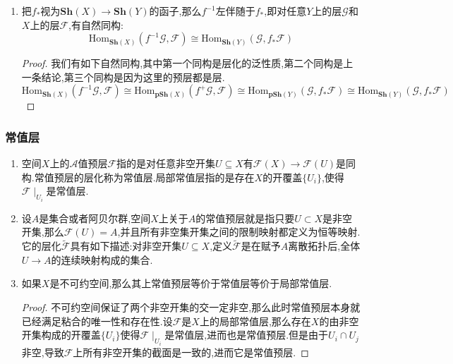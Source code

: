 \begin{enumerate}
\begin{enumerate}[(1)]
\begin{proof}
			反过来设$\psi:\mathscr{G}\to f_*\mathscr{F}$是预层之间的态射,需要构造它诱导的预层之间的态射$\psi':f^{-1}\mathscr{G}\to\mathscr{F}$:取$X$的开子集$U$,取$s\in f^+\mathscr{G}(U)$,如果开集$V\subset Y$满足$f(U)\subset V$,并且存在$s_V\in\mathscr{G}(V)$在正向极限$f^+\mathscr{G}$中的像是$s$,那么$\psi(V)(s_V)\in f_*\mathscr{F}(V)=\mathscr{F}(f^{-1}(V))$,就设$\psi'(U)(s)$是$\psi(V)(s_V)$在$U$上的限制.
			
			验证这两个构造互为逆映射,验证自然性得证.
		\end{proof}
		\item 把$f_*$视为$\textbf{Sh}(X)\to\textbf{Sh}(Y)$的函子,那么$f^{-1}$左伴随于$f_*$,即对任意$Y$上的层$\mathscr{G}$和$X$上的层$\mathscr{F}$,有自然同构:
		$$\mathrm{Hom}_{\textbf{Sh}(X)}(f^{-1}\mathscr{G},\mathscr{F})\cong\mathrm{Hom}_{\textbf{Sh}(Y)}(\mathscr{G},f_*\mathscr{F})$$
		\begin{proof}
			
			我们有如下自然同构,其中第一个同构是层化的泛性质,第二个同构是上一条结论,第三个同构是因为这里的预层都是层.
			$$\mathrm{Hom}_{\textbf{Sh}(X)}(f^{-1}\mathscr{G},\mathscr{F})\cong\mathrm{Hom}_{\textbf{pSh}(X)}(f^+\mathscr{G},\mathscr{F})\cong\mathrm{Hom}_{\textbf{pSh}(Y)}(\mathscr{G},f_*\mathscr{F})\cong\mathrm{Hom}_{\textbf{Sh}(Y)}(\mathscr{G},f_*\mathscr{F})$$
		\end{proof}
	\end{enumerate}
\end{enumerate}
\subsubsection{常值层}

\begin{enumerate}
	\item 空间$X$上的$\mathscr{A}$值预层$\mathscr{F}$指的是对任意非空开集$U\subseteq X$有$\mathscr{F}(X)\to\mathscr{F}(U)$是同构.常值预层的层化称为常值层.局部常值层指的是存在$X$的开覆盖$\{U_i\}$,使得$\mathscr{F}\mid_{U_i}$是常值层.
	\item 设$A$是集合或者阿贝尔群,空间$X$上关于$A$的常值预层就是指只要$U\subset X$是非空开集,那么$\mathscr{F}(U)=A$,并且所有非空集开集之间的限制映射都定义为恒等映射.它的层化$\widetilde{\mathscr{F}}$具有如下描述:对非空开集$U\subseteq X$,定义$\widetilde{\mathscr{F}}$是在赋予$A$离散拓扑后,全体$U\to A$的连续映射构成的集合.
	\item 如果$X$是不可约空间,那么其上常值预层等价于常值层等价于局部常值层.
	\begin{proof}
		
		不可约空间保证了两个非空开集的交一定非空,那么此时常值预层本身就已经满足粘合的唯一性和存在性.设$\mathscr{F}$是$X$上的局部常值层,那么存在$X$的由非空开集构成的开覆盖$\{U_i\}$使得$\mathscr{F}\mid_{U_i}$是常值层,进而也是常值预层.但是由于$U_i\cap U_j$非空,导致$\mathscr{F}$上所有非空开集的截面是一致的,进而它是常值预层.
	\end{proof}
\end{enumerate}
